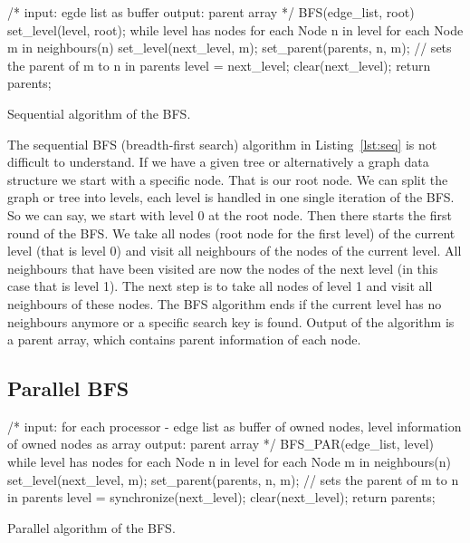 \documentclass[12pt,a4paper]{article}
\begin{document}
\begin{listing}[h]
\begin{ccode}
/*
input: egde list as buffer
output: parent array
*/
BFS(edge_list, root){
	set_level(level, root);
	while level has nodes {
		for each Node n in level {
			for each Node m in neighbours(n){
				set_level(next_level, m);
				set_parent(parents, n, m); // sets the parent of m to n in parents
			}
		}
		level = next_level;
		clear(next_level);
	}
	return parents;
}
\end{ccode}
\caption{Sequential algorithm of the BFS.}
\label{lst:seq}
\end{listing}

The sequential BFS (breadth-first search) algorithm in Listing~\ref{lst:seq} is not difficult to understand. If we have a given tree or alternatively a graph data structure we start with a specific node. That is our root node. We can split the graph or tree into levels, each level is handled in one single iteration of the BFS. So we can say, we start with level 0 at the root node.
Then there starts the first round of the BFS. We take all nodes (root node for the first level) of the current level (that is level 0) and visit all neighbours of the nodes of the current level. All neighbours that have been visited are now the nodes of the next level (in this case that is level 1). The next step is to take all nodes of level 1 and visit all neighbours of these nodes. The BFS algorithm ends if the current level has no neighbours anymore or a specific search key is found. Output of the algorithm is a parent array, which contains parent information of each node.

\subsection{Parallel BFS}
\label{sec:parallel-bfs}

\begin{listing}[h]
\begin{ccode}
/*
input: for each processor - edge list as buffer of owned nodes, level information of owned nodes as array
output: parent array
*/
BFS_PAR(edge_list, level){
	while level has nodes {
		for each Node n in level {
			for each Node m in neighbours(n){
				set_level(next_level, m);
				set_parent(parents, n, m); // sets the parent of m to n in parents
			}
		}
		level = synchronize(next_level);
		clear(next_level);
	}
	return parents;
}
\end{ccode}
\caption{Parallel algorithm of the BFS.}
\label{lst:parallel}
\end{listing}
\end{document}
